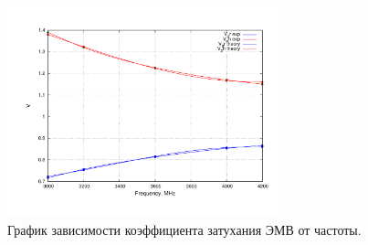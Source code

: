 \documentclass[11pt,a4paper,oneside, reqno]{amsproc}
\begin{document}
\begin{figure}[h!]
    \begin{center}
        \includegraphics[width=0.7\textwidth]{plot1.pdf}
    \end{center}
    \caption{График зависимости коэффициента затухания ЭМВ от частоты.}
    \label{fig:plot2}
\end{figure}
\end{document}
